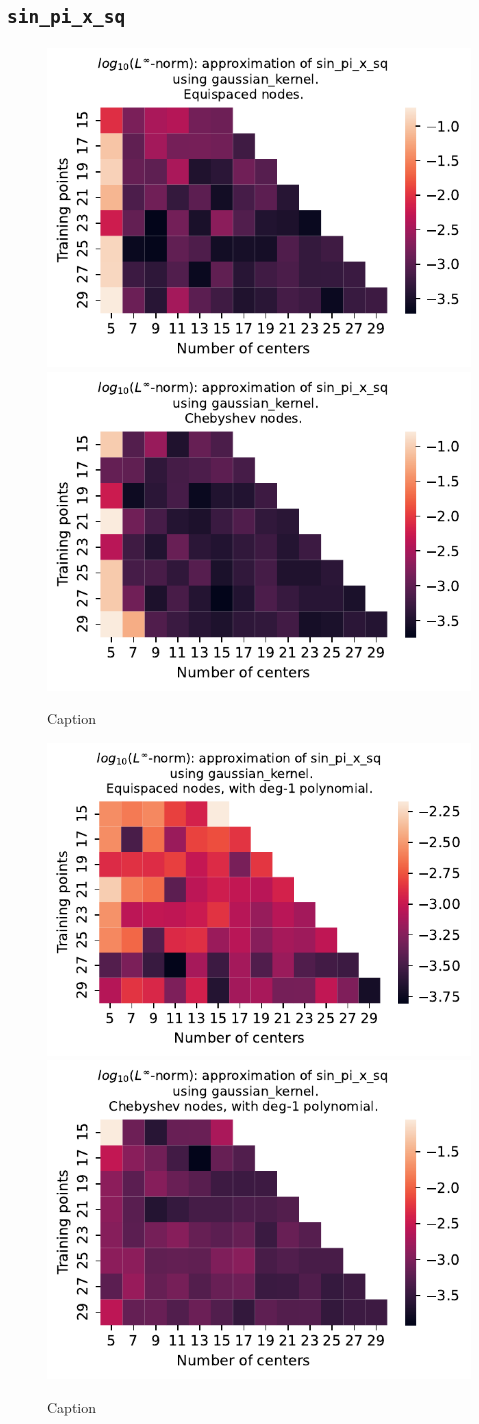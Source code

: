 \documentclass[12pt]{report} %
\begin{document}
\subsection*{\texttt{sin\_pi\_x\_sq}}

\begin{figure}[ht]
    \centering
    
    \includegraphics[width=.49\textwidth]{imagenes/experiments/1d/variational/sin_pi_x_sq-Kgaussian_kernel-Equi.pdf}
    \includegraphics[width=.49\textwidth]{imagenes/experiments/1d/variational/sin_pi_x_sq-Kgaussian_kernel-Cheb.pdf}
    \caption{Caption}
    \label{fig:sin-pi-x-sq-gaussian}
\end{figure}

\begin{figure}[ht]
    \centering
    
    \includegraphics[width=.49\textwidth]{imagenes/experiments/1d/variational/sin_pi_x_sq-Kgaussian_kernel-Poly-Equi.pdf}
    \includegraphics[width=.49\textwidth]{imagenes/experiments/1d/variational/sin_pi_x_sq-Kgaussian_kernel-Poly-Cheb.pdf}
    \caption{Caption}
    \label{fig:sin-pi-x-sq-gaussian-poly}
\end{figure}
\end{document}
